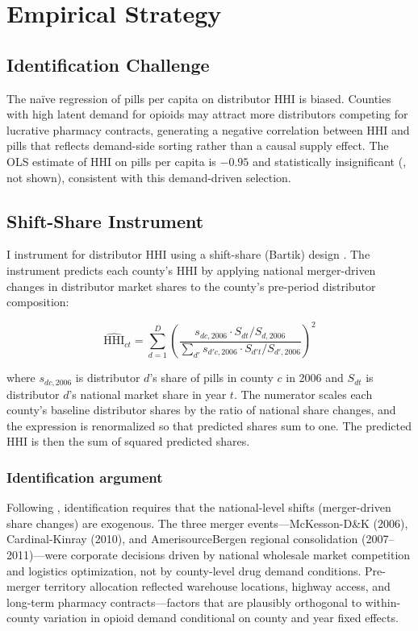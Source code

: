 \documentclass[12pt]{article}
\begin{document}


\section{Empirical Strategy}
\label{sec:strategy}

\subsection{Identification Challenge}

The na\"ive regression of pills per capita on distributor HHI is biased. Counties with high latent demand for opioids may attract more distributors competing for lucrative pharmacy contracts, generating a negative correlation between HHI and pills that reflects demand-side sorting rather than a causal supply effect. The OLS estimate of HHI on pills per capita is $-0.95$ and statistically insignificant (, not shown), consistent with this demand-driven selection.

\subsection{Shift-Share Instrument}

I instrument for distributor HHI using a shift-share (Bartik) design \citep{borusyak2022quasi, goldsmith2020bartik}. The instrument predicts each county's HHI by applying national merger-driven changes in distributor market shares to the county's pre-period distributor composition:

\begin{equation}
\widehat{\text{HHI}}_{ct} = \sum_{d=1}^{D} \left( \frac{s_{dc,2006} \cdot S_{dt} / S_{d,2006}}{\sum_{d'} s_{d'c,2006} \cdot S_{d't} / S_{d',2006}} \right)^2
\end{equation}

where $s_{dc,2006}$ is distributor $d$'s share of pills in county $c$ in 2006 and $S_{dt}$ is distributor $d$'s national market share in year $t$. The numerator scales each county's baseline distributor shares by the ratio of national share changes, and the expression is renormalized so that predicted shares sum to one. The predicted HHI is then the sum of squared predicted shares.

\subsubsection*{Identification argument} Following \citet{borusyak2022quasi}, identification requires that the national-level shifts (merger-driven share changes) are exogenous. The three merger events---McKesson-D\&K (2006), Cardinal-Kinray (2010), and AmerisourceBergen regional consolidation (2007--2011)---were corporate decisions driven by national wholesale market competition and logistics optimization, not by county-level drug demand conditions. Pre-merger territory allocation reflected warehouse locations, highway access, and long-term pharmacy contracts---factors that are plausibly orthogonal to within-county variation in opioid demand conditional on county and year fixed effects.
\end{document}
